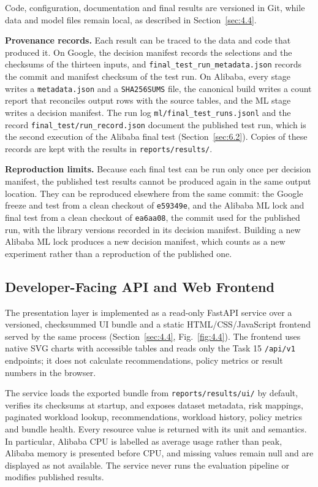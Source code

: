 Code, configuration, documentation and final results are versioned in Git, while data and model files remain local, as described in Section~\ref{sec:4.4}.

\textbf{Provenance records.} Each result can be traced to the data and code that produced it. On Google, the decision manifest records the selections and the checksums of the thirteen inputs, and \texttt{final\_test\_run\_metadata.json} records the commit and manifest checksum of the test run. On Alibaba, every stage writes a \texttt{metadata.json} and a \texttt{SHA256SUMS} file, the canonical build writes a count report that reconciles output rows with the source tables, and the ML stage writes a decision manifest. The run log \texttt{ml/final\_test\_runs.jsonl} and the record \texttt{final\_test/run\_record.json} document the published test run, which is the second execution of the Alibaba final test (Section~\ref{sec:6.2}). Copies of these records are kept with the results in \texttt{reports/results/}.

\textbf{Reproduction limits.} Because each final test can be run only once per decision manifest, the published test results cannot be produced again in the same output location. They can be reproduced elsewhere from the same commit: the Google freeze and test from a clean checkout of \texttt{e59349e}, and the Alibaba ML lock and final test from a clean checkout of \texttt{ea6aa08}, the commit used for the published run, with the library versions recorded in its decision manifest. Building a new Alibaba ML lock produces a new decision manifest, which counts as a new experiment rather than a reproduction of the published one.

\subsection{Developer-Facing API and Web Frontend}\label{sec:8.3}

The presentation layer is implemented as a read-only FastAPI service over a versioned, checksummed UI bundle and a static HTML/CSS/JavaScript frontend served by the same process (Section~\ref{sec:4.4}, Fig.~\ref{fig:4.4}). The frontend uses native SVG charts with accessible tables and reads only the Task 15 \texttt{/api/v1} endpoints; it does not calculate recommendations, policy metrics or result numbers in the browser.

The service loads the exported bundle from \texttt{reports/results/ui/} by default, verifies its checksums at startup, and exposes dataset metadata, risk mappings, paginated workload lookup, recommendations, workload history, policy metrics and bundle health. Every resource value is returned with its unit and semantics. In particular, Alibaba CPU is labelled as average usage rather than peak, Alibaba memory is presented before CPU, and missing values remain null and are displayed as not available. The service never runs the evaluation pipeline or modifies published results.

